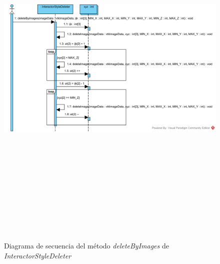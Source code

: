 \begin{figure}[H]
	\centering
	\includegraphics[angle=90,height=18cm]{imagenes/diagramas/secuencia/InteractorStyleDeleter_DeleteByImages}
	\caption{Diagrama de secuencia del método \textit{deleteByImages} de \textit{InteractorStyleDeleter}}
	\label{fig:diagrama_secuencia_interactorstyledeleter_deletebyimages}
\end{figure}

